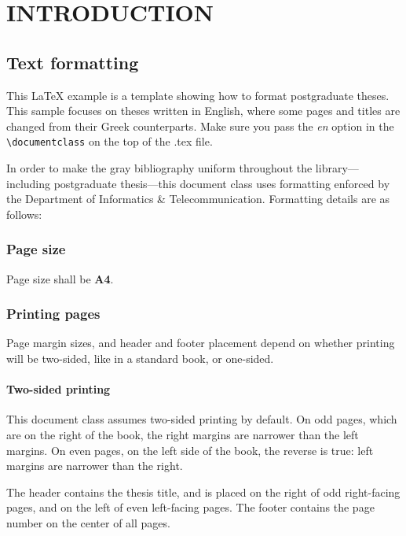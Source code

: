 \documentclass[en,inscr,ack,preface]{dimscthesis}
\begin{document}
\frontmatter

\mainmatter

\chapter{INTRODUCTION} \label{introduction}

\section{Text formatting} \label{text_formatting}

This \LaTeX{} example is a template showing how to format postgraduate theses.
This sample focuses on theses written in English, where some pages and titles are changed from their Greek counterparts.
Make sure you pass the \emph{en} option in the \verb|\documentclass| on the top of the .tex file.

In order to make the gray bibliography uniform throughout the library---including postgraduate thesis---this document class uses formatting enforced by the Department of Informatics \& Telecommunication.
Formatting details are as follows:

\subsection{Page size} \label{page_size}

Page size shall be \textbf{A4}.

\subsection{Printing pages} \label{printing_pages}

Page margin sizes, and header and footer placement depend on whether printing will be two-sided, like in a standard book, or one-sided.

\subsubsection{Two-sided printing} \label{two-sided_printing}

This document class assumes two-sided printing by default.
On odd pages, which are on the right of the book, the right margins are narrower than the left margins.
On even pages, on the left side of the book, the reverse is true: left margins are narrower than the right.

The header contains the thesis title, and is placed on the right of odd right-facing pages, and on the left of even left-facing pages.
The footer contains the page number on the center of all pages.
\end{document}
